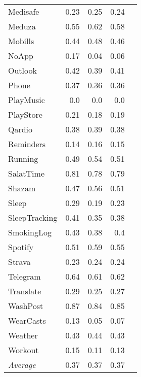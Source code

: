 \begin{tabular}{lrrrr}
    Medisafe & 0.23 & 0.25 & 0.24 \\
    Meduza & 0.55 & 0.62 & 0.58 \\
    Mobills & 0.44 & 0.48 & 0.46 \\
    NoApp & 0.17 & 0.04 & 0.06 \\
    Outlook & 0.42 & 0.39 & 0.41 \\
    Phone & 0.37 & 0.36 & 0.36 \\
    PlayMusic & 0.0 & 0.0 & 0.0 \\
    PlayStore & 0.21 & 0.18 & 0.19 \\
    Qardio & 0.38 & 0.39 & 0.38 \\
    Reminders & 0.14 & 0.16 & 0.15 \\
    Running & 0.49 & 0.54 & 0.51 \\
    SalatTime & 0.81 & 0.78 & 0.79 \\
    Shazam & 0.47 & 0.56 & 0.51 \\
    Sleep & 0.29 & 0.19 & 0.23 \\
    SleepTracking & 0.41 & 0.35 & 0.38 \\
    SmokingLog & 0.43 & 0.38 & 0.4 \\
    Spotify & 0.51 & 0.59 & 0.55 \\
    Strava & 0.23 & 0.24 & 0.24 \\
    Telegram & 0.64 & 0.61 & 0.62 \\
    Translate & 0.29 & 0.25 & 0.27 \\
    WashPost & 0.87 & 0.84 & 0.85 \\
    WearCasts & 0.13 & 0.05 & 0.07 \\
    Weather & 0.43 & 0.44 & 0.43 \\
    Workout & 0.15 & 0.11 & 0.13 \\
    \emph{Average} & 0.37 & 0.37 & 0.37 \\
\end{tabular}